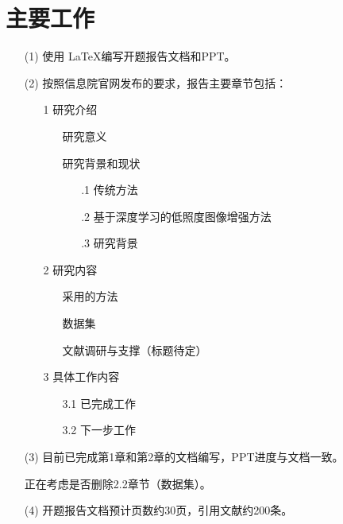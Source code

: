 \documentclass[a4paper, 10pt]{article}
\begin{document}
	\section{主要工作}
	
	\begin{itemize}
		\item[(1)] 使用 \LaTeX 编写开题报告文档和PPT。
		
		\item[(2)] 按照信息院官网发布的要求，报告主要章节包括：
		
			\begin{itemize}
				\item [1] 研究介绍		
					\begin{itemize}
						\item [\checkmark 1.1] 研究意义
						\item [\checkmark 1.2] 研究背景和现状
						\begin{itemize}
							\item [\checkmark 1.2.1] 传统方法
							\item [\checkmark 1.2.2] 基于深度学习的低照度图像增强方法
							\item [\checkmark 1.2.3] 研究背景
						\end{itemize}						
					\end{itemize}				
				\item [2] 研究内容			
					\begin{itemize}
						\item [\checkmark 2.1] 采用的方法
						\item [\checkmark 2.2] 数据集
						\item [\checkmark 2.3] 文献调研与支撑（标题待定）
					\end{itemize}			
				\item [3] 具体工作内容				
					\begin{itemize}
						\item [3.1] 已完成工作
						\item [3.2] 下一步工作
					\end{itemize}
			\end{itemize}
		
		\item[(3)] 目前已完成第1章和第2章的文档编写，PPT进度与文档一致。
		
			\item[\checkmark] 正在考虑是否删除2.2章节（数据集）。
		
		\item[(4)] 开题报告文档预计页数约30页，引用文献约200条。
	\end{itemize}
	
\end{document}
